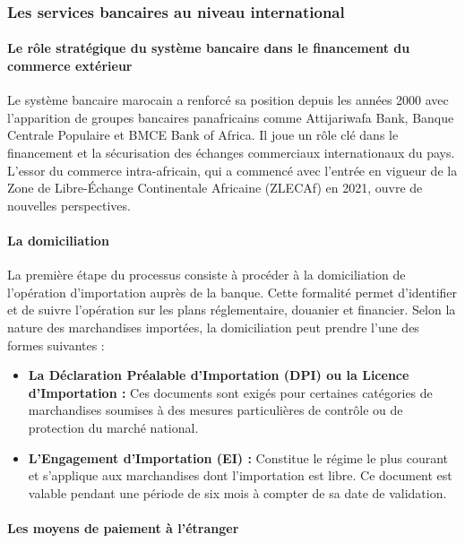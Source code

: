 \subsubsection*{Les services bancaires au niveau international}

\paragraph{Le rôle stratégique du système bancaire dans le financement du commerce extérieur}

Le système bancaire marocain a renforcé sa position depuis les années 2000 avec l'apparition de groupes bancaires panafricains comme Attijariwafa Bank, Banque Centrale Populaire et BMCE Bank of Africa. Il joue un rôle clé dans le financement et la sécurisation des échanges commerciaux internationaux du pays. L'essor du commerce intra-africain, qui a commencé avec l'entrée en vigueur de la Zone de Libre-Échange Continentale Africaine (ZLECAf) en 2021, ouvre de nouvelles perspectives.

\paragraph{La domiciliation}

La première étape du processus consiste à procéder à la domiciliation de l'opération d'importation auprès de la banque. Cette formalité permet d'identifier et de suivre l'opération sur les plans réglementaire, douanier et financier. Selon la nature des marchandises importées, la domiciliation peut prendre l'une des formes suivantes :

\begin{itemize}
  \item \textbf{La Déclaration Préalable d'Importation (DPI) ou la Licence d'Importation :} Ces documents sont exigés pour certaines catégories de marchandises soumises à des mesures particulières de contrôle ou de protection du marché national.

  \item \textbf{L'Engagement d'Importation (EI) :} Constitue le régime le plus courant et s'applique aux marchandises dont l'importation est libre. Ce document est valable pendant une période de six mois à compter de sa date de validation.
\end{itemize}

\paragraph{Les moyens de paiement à l'étranger}

